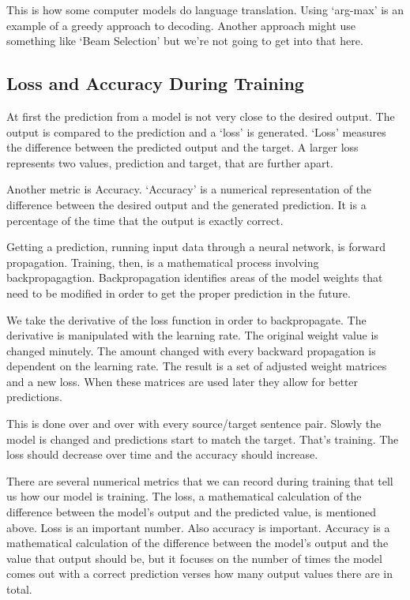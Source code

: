 This is how some computer models do language translation. Using `arg-max' is an example of a greedy approach to decoding. Another approach might use something like `Beam Selection' but we're not going to get into that here.



\subsection{Loss and Accuracy During Training}

At first the prediction from a model is not very close to the desired output. The output is compared to the prediction and a `loss' is generated. `Loss' measures the difference between the predicted output and the target. A larger loss represents two values, prediction and target, that are further apart. 

Another metric is Accuracy. `Accuracy' is a numerical representation of the difference between the desired output and the generated prediction. It is a percentage of the time that the output is exactly correct.

Getting a prediction, running input data through a neural network, is forward propagation. Training, then, is a mathematical process involving backpropagagtion. Backpropagation identifies areas of the model weights that need to be modified in order to get the proper prediction in the future.

We take the derivative of the loss function in order to backpropagate. The derivative is manipulated with the learning rate. The original weight value is changed minutely. The amount changed with every backward propagation is dependent on the learning rate. The result is a set of adjusted weight matrices and a new loss. When these matrices are used later they allow for better predictions. 

This is done over and over with every source/target sentence pair. Slowly the model is changed and predictions start to match the target. That's training. The loss should decrease over time and the accuracy should increase.

There are several numerical metrics that we can record during training that tell us how our model is training. The loss, a mathematical calculation of the difference between the model's output and the predicted value, is mentioned above. Loss is an important number. Also accuracy is important. Accuracy is a mathematical calculation of the difference between the model's output and the value that output should be, but it focuses on the number of times the model comes out with a correct prediction verses how many output values there are in total.


